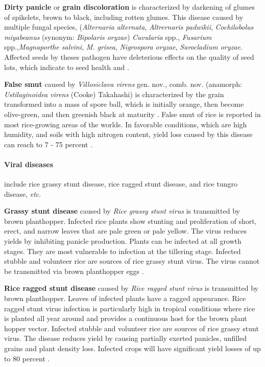 \documentclass[12pt, oneside]{report}
\begin{document}
\textbf{Dirty panicle} or \textbf{grain discoloration} is characterized by darkening of glumes of spikelets, brown to black, including rotten glumes. This disease caused by multiple fungal species, (\textit{Alternaria alternata}, \textit{Altrernaris padwikii}, \textit{Cochilobolus miyabeanus} (synonym: \textit{Bipolaris oryzae}) \textit{Cuvularia} spp., \textit {Fusarium} spp.,\textit{Magnaporthe salvini}, \textit{M. grisea}, \textit{Nigrospora oryzae}, \textit{Sarocladium oryzae}. Affected seeds by theses pathogen have deleterious effects on the quality of seed lots, which indicate to seed health \citep{ouricedisease} and \citep{mew2002handbook}. 
 
\textbf{False smut} caused by \textit{Villosiclava virens} gen. nov., comb. nov. (anamorph: \textit{Ustilaginoidea virens} (Cooke) Takahashi) is characterized by the grain transformed into a mass of spore ball, which is initially orange, then become olive-green, and then greenish black at maturity \citep{tanaka2008villosiclava}. False smut of rice is reported in most rice-growing areas of the worlds. In favorable conditions, which are high humidity, and soils with high nitrogen content, yield loss caused by this disease can reach to 7 - 75 percent \citep{ouricedisease}.

\paragraph{Viral diseases} include rice grassy stunt disease, rice ragged stunt disease, and rice tungro disease, \textit{etc}. 

\textbf{Grassy stunt disease} caused by \textit{Rice grassy stunt virus} is transmitted by brown planthopper. Infected rice plants show stunting and proliferation of short, erect, and narrow leaves that are pale green or pale yellow. The virus reduces yields by inhibiting panicle production. Plants can be infected at all growth stages. They are most vulnerable to infection at the tillering stage. Infected stubble and volunteer rice are sources of rice grassy stunt virus. The virus cannot be transmitted via brown planthopper eggs \citep{ouricedisease, ling1972rice}.

\textbf{Rice ragged stunt disease} caused by \textit{Rice ragged stunt virus} is transmitted by brown planthopper. Leaves of infected plants have a ragged appearance. Rice ragged stunt virus infection is particularly high in tropical conditions where rice is planted all year around and provides a continuous host for the brown plant hopper vector. Infected stubble and volunteer rice are sources of rice grassy stunt virus. The disease reduces yield by causing partially exerted panicles, unfilled grains and plant density loss. Infected crops will have significant yield losses of up to 80 percent \citep{ling1972rice}.
\end{document}
